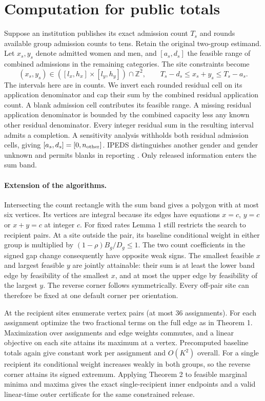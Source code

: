 \documentclass[11pt]{article}
\begin{document}
\section{Computation for public totals}\label{app:totals}
Suppose an institution publishes its exact admission count $T_s$ and rounds available group admission counts to tens. Retain the original two-group estimand. Let $x_s,y_s$ denote admitted women and men, and $[a_s,d_s]$ the feasible range of combined admissions in the remaining categories. The site constraints become
\[
 (x_s,y_s)\in ([l_x,h_x]\times[l_y,h_y])\cap\mathbb Z^2,\qquad
 T_s-d_s\le x_s+y_s\le T_s-a_s .
\]
The intervals here are in counts. We invert each rounded residual cell on its application denominator and cap their sum by the combined residual application count. A blank admission cell contributes its feasible range. A missing residual application denominator is bounded by the combined capacity less any known other residual denominator. Every integer residual sum in the resulting interval admits a completion. A sensitivity analysis withholds both residual admission cells, giving $[a_s,d_s]=[0,n_{\rm other}]$. IPEDS distinguishes another gender and gender unknown and permits blanks in reporting \cite{ipedsform}. Only released information enters the sum band.

\paragraph{Extension of the algorithms.}
Intersecting the count rectangle with the sum band gives a polygon with at most six vertices. Its vertices are integral because its edges have equations $x=c$, $y=c$ or $x+y=c$ at integer $c$. For fixed rates Lemma 1 still restricts the search to recipient pairs. At a site outside the pair, its baseline conditional weight in either group is multiplied by $(1-\rho)B_g/D_g\le1$. The two count coefficients in the signed gap change consequently have opposite weak signs. The smallest feasible $x$ and largest feasible $y$ are jointly attainable: their sum is at least the lower band edge by feasibility of the smallest $x$, and at most the upper edge by feasibility of the largest $y$. The reverse corner follows symmetrically. Every off-pair site can therefore be fixed at one default corner per orientation.

At the recipient sites enumerate vertex pairs (at most 36 assignments). For each assignment optimize the two fractional terms on the full edge as in Theorem 1. Maximization over assignments and edge weights commutes, and a linear objective on each site attains its maximum at a vertex. Precomputed baseline totals again give constant work per assignment and $O(K^2)$ overall. For a single recipient its conditional weight increases weakly in both groups, so the reverse corner attains its signed extremum. Applying Theorem 2 to feasible marginal minima and maxima gives the exact single-recipient inner endpoints and a valid linear-time outer certificate for the same constrained release.
\end{document}
